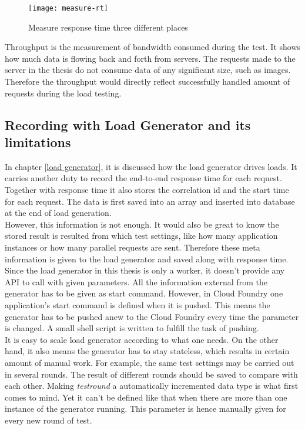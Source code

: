\begin{figure}[h]
	\centering
	\texttt{[image: measure-rt]}
	\caption{Measure response time three different places}
	\label{measure-rt}
\end{figure}

Throughput is the measurement of bandwidth consumed during the test. It shows how much data is flowing back and forth from servers. The requests made to the server in the thesis do not consume data of any significant size, such as images. Therefore the throughput would directly reflect successfully handled amount of requests during the load testing. \\
\subsection{Recording with Load Generator and its limitations}
 In chapter \ref{load generator}, it is discussed how the load generator drives loads. It carries another duty to record the end-to-end response time for each request. Together with response time it also stores the correlation id and the start time for each request. The data is first saved into an array and inserted into database at the end of load generation. \\
 However, this information is not enough. It would also be great to know the stored result is resulted from which test settings, like how many application instances or how many parallel requests are sent. Therefore these meta information is given to the load generator and saved along with response time. Since the load generator in this thesis is only a worker, it doesn't provide any API to call with given parameters. All the information external from the generator has to be given as start command. However, in Cloud Foundry one application's start command is defined when it is pushed. This means the generator has to be pushed anew to the Cloud Foundry every time the parameter is changed. A small shell script is written to fulfill the task of pushing. \\
 
 It is easy to scale load generator according to what one needs. On the other hand, it also means the generator has to stay stateless, which results in certain amount of manual work. For example, the same test settings may be carried out in several rounds. The result of different rounds should be saved to compare with each other. Making \textit{testround }a automatically incremented data type is what first comes to mind. Yet it can't be defined like that when there are more than one instance of the generator running. This parameter is hence manually given for every new round of test.\\
 
